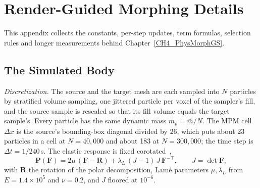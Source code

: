 
\clearpage
\chapter{Render-Guided Morphing Details}
\label{app:ch4}

\renewcommand{\theequation}{\thechapter.\arabic{equation}}
\setcounter{equation}{0}

This appendix collects the constants, per-step updates, term formulas, selection rules and longer measurements behind
Chapter~\ref{CH4_PhysMorphGS}.

\section{The Simulated Body}
\label{app:ch4_body}

\textit{Discretization.} The source and the target mesh are each sampled into $N$ particles by stratified volume sampling,
one jittered particle per voxel of the sampler's fill, and the source sample is rescaled so that its fill volume equals
the target sample's. Every particle has the same dynamic mass $m_p=\bar m/N$. The MPM cell $\Delta x$ is the source's
bounding-box diagonal divided by 26, which puts about 23 particles in a cell at $N=40{,}000$ and about 183 at
$N=300{,}000$; the time step is $\Delta t=1/240$\,s. The elastic response is fixed
corotated~\citep{2012-FixedCoratedElasticty,stomakhin2013material},
\begin{equation}
\label{eq:fc_stress}
\mathbf{P}(\mathbf{F})=2\mu\,(\mathbf{F}-\mathbf{R})+\lambda_{L}\,(J-1)\,J\,\mathbf{F}^{-\top},
\qquad J=\det\mathbf{F},
\end{equation}
with $\mathbf{R}$ the rotation of the polar decomposition, Lam\'e parameters $\mu,\lambda_L$ from $E=1.4\times10^{5}$ and
$\nu=0.2$, and $J$ floored at $10^{-6}$.

